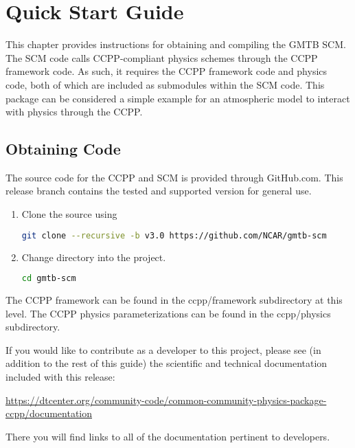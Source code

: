 \chapter{Quick Start Guide}
\label{chapter: quick}

This chapter provides instructions for obtaining and compiling the GMTB SCM. The SCM code calls CCPP-compliant physics schemes through the CCPP framework code. As such, it requires the CCPP framework code and physics code, both of which are included as submodules within the SCM code. This package can be considered a simple example for an atmospheric model to interact with physics through the CCPP.

\section{Obtaining Code}

The source code for the CCPP and SCM is provided through GitHub.com.  This release branch contains the tested and supported version for general use.

\begin{enumerate}
    \item Clone the source using
\begin{lstlisting}[language=bash]
git clone --recursive -b v3.0 https://github.com/NCAR/gmtb-scm
\end{lstlisting}
    \item Change directory into the project.
\begin{lstlisting}[language=bash]
cd gmtb-scm
\end{lstlisting}
\end{enumerate}

The CCPP framework can be found in the ccpp/framework subdirectory at this level.  The CCPP physics parameterizations can be found in the ccpp/physics subdirectory.

If you would like to contribute as a developer to this project, please see (in addition to the rest of this guide) the scientific and technical documentation included with this release:

\url{https://dtcenter.org/community-code/common-community-physics-package-ccpp/documentation}

There you will find links to all of the documentation pertinent to developers.

